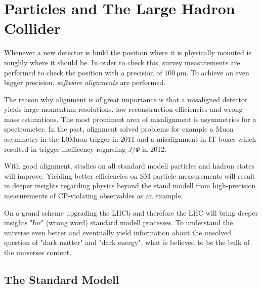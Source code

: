 \chapter{Particles and The Large Hadron Collider}
\label{sec:particleslhc}


Whenever a new detector is build the position where it is physically mounted is
roughly where it should be. In order to check this, survey measurements are
performed to check the position with a precision of $\SI{100}{\micro\metre}$.
To achieve an even bigger precision, \textit{software alignments} are performed.

The reason why alignment is of great importance is that a misaligned detector
yields large momentum resolutions, low reconstruction efficiencies and wrong
mass estimations.
The most prominent area of misalignment is asymmetries for a spectrometer.
In the past, alignment solved problems for example a Muon asymmetry in the
L0Muon trigger in 2011 and a misalignment in IT boxes which resulted in trigger inefficency regarding $J/\Psi$ in 2012.

With good alignment, studies on all standard modell particles and hadron states
will improve. Yielding better efficiencies on SM particle measurements will
result in deeper insights regarding physics beyond the stand modell from high-precision measurements of CP-violating observables as an example.

On a grand scheme upgrading the LHCb and therefore the LHC will bring deeper
insights "for" (wrong word) standard modell processes. To understand the universe even better and eventually yield information about the unsolved question of "dark matter" and
"dark energy", what is believed to be the bulk of the universes content.

\section{The Standard Modell}
\label{sec:sm}

